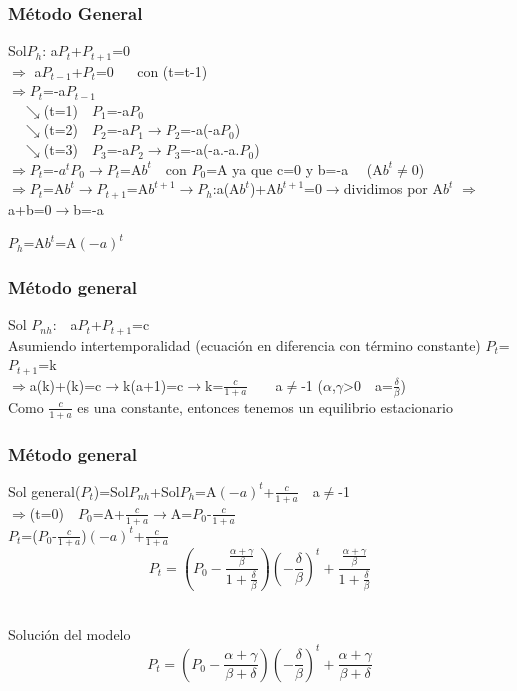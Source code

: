 \documentclass[11pt]{beamer}
\begin{document}
\begin{frame}
\frametitle{Método General}
Sol$P_h$: a$P_t$+$P_{t+1}$=0
\\
$\Longrightarrow$ a$P_{t-1}$+$P_t$=0 $\quad$ con (t=t-1)
\\
$\Longrightarrow$$P_t$=-a$P_{t-1}$
\\
$\quad$$\searrow$(t=1)$\quad$$P_1$=-a$P_0$
\\
$\quad$$\searrow$(t=2)$\quad$$P_2$=-a$P_1$$\rightarrow$$P_2$=-a(-a$P_0$)
\\
$\quad$$\searrow$(t=3)$\quad$$P_3$=-a$P_2$$\rightarrow$$P_3$=-a(-a.-a.$P_0$)
\\
$\Longrightarrow$$P_t$=-$a^t$$P_0$$\rightarrow$$P_t$=A$b^t$$\quad$con $P_0$=A ya que c=0 y b=-a $\quad$(A$b^t$$\neq$0)
\\
$\Longrightarrow$$P_t$=A$b^t$$\rightarrow$$P_{t+1}$=A$b^{t+1}$$\rightarrow$$P_h$:a(A$b^t$)+A$b^{t+1}$=0$\rightarrow$dividimos por A$b^t$
$\Longrightarrow$a+b=0$\rightarrow$b=-a
\begin{block}{}
\begin{center}
	$P_h$=A$b^t$=A$(-a)^t$
\end{center}
\end{block}
\end{frame}
\begin{frame}
	\frametitle{Método general}
	Sol $P_{nh}$:$\quad$a$P_t$+$P_{t+1}$=c $\quad$ 
	\\
	Asumiendo intertemporalidad (ecuación  en  diferencia  con  término  constante) $P_t$=$P_{t+1}$=k
	\\
	$\Longrightarrow$a(k)+(k)=c$\rightarrow$k(a+1)=c$\rightarrow$k=$\frac{c}{1+a}$$\quad$$\quad$a$\neq$-1 ($\alpha$,$\gamma$>0$\quad$a=$\frac{\delta}{\beta}$)
	\\
	Como $\frac{c}{1+a}$ es una constante, entonces tenemos un equilibrio estacionario
\end{frame}
\begin{frame}
	\frametitle{Método general}
	Sol general($P_t$)=Sol$P_{nh}$+Sol$P_h$=A$(-a)^t$+$\frac{c}{1+a}$$\quad$a$\neq$-1
	\\
	$\Longrightarrow$(t=0)$\quad$$P_0$=A+$\frac{c}{1+a}$$\rightarrow$A=$P_0$-$\frac{c}{1+a}$
	\\
	$P_t$=($P_0$-$\frac{c}{1+a}$)$(-a)^t$+$\frac{c}{1+a}$
	\\
	\begin{equation*}
	P_{t}=(P_{0}-\frac{\frac{\alpha+\gamma}{\beta}}{1+\frac{\delta}{\beta}})(-\frac{\delta}{\beta})^{t}+\frac{\frac{\alpha+\gamma}{\beta}}{1+\frac{\delta}{\beta}}
	\end{equation*}
	\\
\begin{block}{Solución del modelo}
\begin{equation*}
P_{t}=(P_{0}-\frac{\alpha+\gamma}{\beta+\delta})(-\frac{\delta}{\beta})^t+\frac{\alpha+\gamma}{\beta+\delta}
\end{equation*}
\end{block}
\end{frame}
\end{document}
